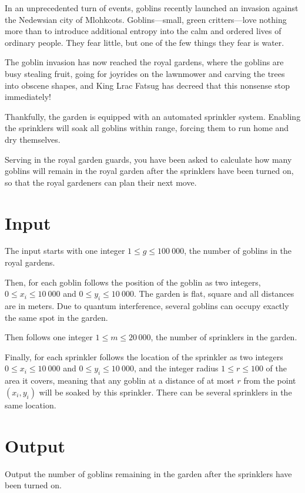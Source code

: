 
In an unprecedented turn of events, goblins recently launched an invasion against the Nedewsian city
of Mlohkcots. Goblins---small, green critters---love nothing more than to introduce additional entropy
into the calm and ordered lives of ordinary people. They fear little, but one of the few things they fear is water.


The goblin invasion has now reached the royal gardens, where the goblins are busy stealing fruit,
going for joyrides on the lawnmower and carving the trees into obscene shapes, and
King Lrac Fatsug has decreed that this nonsense stop immediately!

Thankfully, the garden is equipped with an automated sprinkler system. Enabling the sprinklers will soak
all goblins within range, forcing them to run home and dry themselves.

Serving in the royal garden guards, you have been asked to calculate how many goblins will remain in
the royal garden after the sprinklers have been turned on, so that the royal gardeners can plan their next move.

\section*{Input}

The input starts with one integer $1 \leq g \leq 100\ 000$, the number of goblins in the royal gardens.

Then, for each goblin follows the position of the goblin as two integers, $0 \leq x_i \leq 10\ 000$
and $0 \leq y_i \leq 10\ 000$. The garden is flat, square and all distances are in meters. Due to
quantum interference, several
goblins can occupy exactly the same spot in the garden.

Then follows one integer $1 \leq m \leq 20\,000$, the number of sprinklers in the garden.

Finally, for each sprinkler follows the location of the sprinkler as two integers $0 \leq x_i \leq 10\ 000$ and
$0 \leq y_i \leq 10\ 000$, and the integer radius  $1 \leq r \leq 100$ of the area it covers, meaning that any goblin
at a distance of at most $r$ from the point $(x_i, y_i)$ will be soaked by this sprinkler.
There can be several sprinklers in the same location.

\section*{Output}
Output the number of goblins remaining in the garden after the sprinklers have been turned on.

